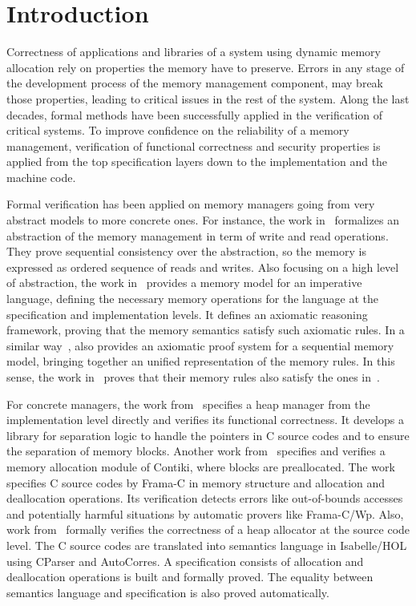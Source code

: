 \section{Introduction}
Correctness of applications and libraries of a system using dynamic memory allocation rely on properties the memory have to preserve. Errors in any stage of the development process of the memory management component, may break those properties, leading to critical issues in the rest of the system. Along the last decades, formal methods have been successfully applied in the verification of critical systems. To improve confidence on the reliability of a memory management, verification of functional correctness and security properties is applied from the top specification layers down to the implementation and the machine code.

Formal verification has been applied on memory managers going from very abstract models to more concrete ones. For instance, the work in~\cite{reg_higham} formalizes an abstraction of the memory management in term of write and read operations. They prove sequential consistency over the abstraction, so the memory is expressed as ordered sequence of reads and writes. Also focusing on a high level of abstraction, the work in~\cite{reg_blazy} provides a memory model for an imperative language, defining the necessary memory operations for the language at the specification and implementation levels. It defines an axiomatic reasoning framework, proving that the memory semantics satisfy such axiomatic rules. In a similar way~\cite{reg_mansky}, also provides an axiomatic proof system for a sequential memory model, bringing together an unified representation of the memory rules. In this sense, the work in~\cite{reg_mansky} proves that their memory rules also satisfy the ones in~\cite{reg_blazy}.

For concrete managers, the work from~\cite{reg_marti} specifies a heap manager from the implementation level directly and verifies its functional correctness. It develops a library for separation logic to handle the pointers in C source codes and to ensure the separation of memory blocks. Another work from~\cite{reg_mangano} specifies and verifies a memory allocation module of Contiki, where blocks are preallocated. The work specifies C source codes by Frama-C in memory structure and allocation and deallocation operations. Its verification detects errors like out-of-bounds accesses and potentially harmful situations by automatic provers like Frama-C/Wp. Also, work from~\cite{reg_sahebolamri} formally verifies the correctness of a heap allocator at the source code level. The C source codes are translated into semantics language in Isabelle/HOL using CParser and AutoCorres. A specification consists of allocation and deallocation operations is built and formally proved. The equality between semantics language and specification is also proved automatically.

